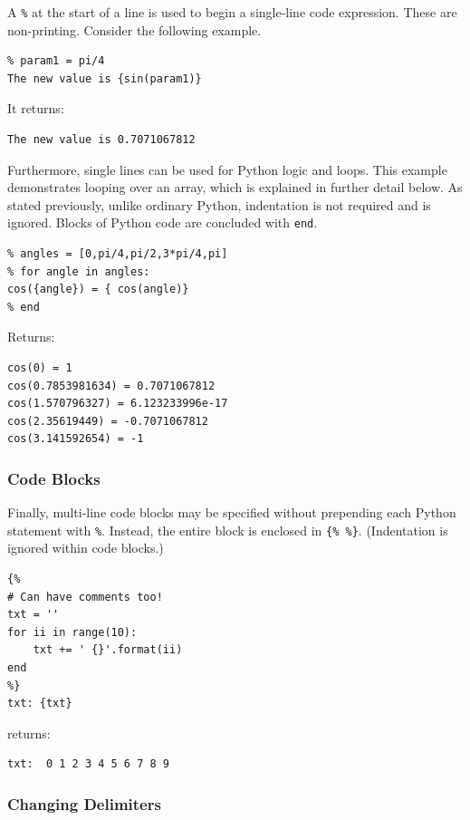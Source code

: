 {A \texttt{\%} at the start of a line is used to begin a single-line code expression.
These are non-printing.
Consider the following example.

\begin{verbatim}
% param1 = pi/4
The new value is {sin(param1)}
\end{verbatim}

It returns:

\begin{verbatim}
The new value is 0.7071067812
\end{verbatim}

Furthermore, single lines can be used for Python logic and loops. This example 
demonstrates looping over an array, which is explained in further detail below.
As stated previously, unlike ordinary Python, indentation is not required and is 
ignored. Blocks of Python code are concluded with \texttt{end}.

\begin{verbatim}
% angles = [0,pi/4,pi/2,3*pi/4,pi]
% for angle in angles:
cos({angle}) = { cos(angle)}
% end
\end{verbatim}

Returns:

\begin{verbatim}
cos(0) = 1
cos(0.7853981634) = 0.7071067812
cos(1.570796327) = 6.123233996e-17
cos(2.35619449) = -0.7071067812
cos(3.141592654) = -1
\end{verbatim}

\subsubsection{Code Blocks}\label{interfaces:code-blocks}

Finally, multi-line code blocks may be specified without prepending each 
Python statement with \texttt{\%}. Instead, the entire block is enclosed
in \texttt{\{\% \%\}}. (Indentation is ignored within code blocks.)

\begin{verbatim}
{%
# Can have comments too!
txt = ''
for ii in range(10):
    txt += ' {}'.format(ii)
end
%}
txt: {txt}
\end{verbatim}

returns:

\begin{verbatim}
txt:  0 1 2 3 4 5 6 7 8 9
\end{verbatim}

\subsubsection{Changing Delimiters}\label{interfaces:changing-delimiters}

}
